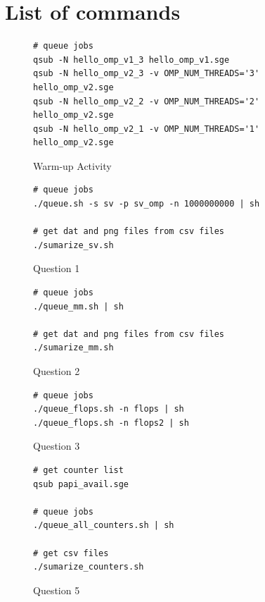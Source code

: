 \documentclass[12pt]{article}
\begin{document}
\newpage

\section{List of commands}

\begin{figure}[h!]
	\begin{verbatim}
# queue jobs
qsub -N hello_omp_v1_3 hello_omp_v1.sge
qsub -N hello_omp_v2_3 -v OMP_NUM_THREADS='3' hello_omp_v2.sge
qsub -N hello_omp_v2_2 -v OMP_NUM_THREADS='2' hello_omp_v2.sge
qsub -N hello_omp_v2_1 -v OMP_NUM_THREADS='1' hello_omp_v2.sge
	\end{verbatim}
\caption{Warm-up Activity}\label{code:wa}
\end{figure}

\begin{figure}[h!]
	\begin{verbatim}
# queue jobs
./queue.sh -s sv -p sv_omp -n 1000000000 | sh

# get dat and png files from csv files
./sumarize_sv.sh
	\end{verbatim}
\caption{Question 1}\label{code:q1}
\end{figure}

\begin{figure}[h!]
	\begin{verbatim}
# queue jobs
./queue_mm.sh | sh

# get dat and png files from csv files
./sumarize_mm.sh
	\end{verbatim}
\caption{Question 2}\label{code:q2}
\end{figure}

\begin{figure}[h!]
	\begin{verbatim}
# queue jobs
./queue_flops.sh -n flops | sh
./queue_flops.sh -n flops2 | sh
	\end{verbatim}
\caption{Question 3}\label{code:q3}
\end{figure}

\newpage

\begin{figure}[h!]
	\begin{verbatim}
# get counter list
qsub papi_avail.sge

# queue jobs
./queue_all_counters.sh | sh

# get csv files
./sumarize_counters.sh
	\end{verbatim}
\caption{Question 5}\label{code:q5}
\end{figure}
\end{document}
